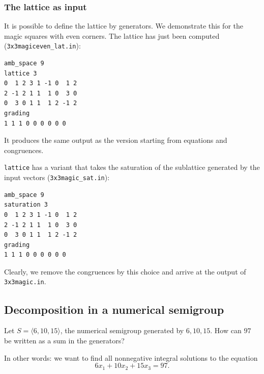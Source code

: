 \subsubsection{The lattice as input}\label{latt_ex}

It is possible to define the lattice by generators. We demonstrate this for the magic squares with even corners. The lattice has just been computed (\verb|3x3magiceven_lat.in|):

\begin{Verbatim}
amb_space 9
lattice 3
0  1 2 3 1 -1 0  1 2
2 -1 2 1 1  1 0  3 0
0  3 0 1 1  1 2 -1 2
grading
1 1 1 0 0 0 0 0 0
\end{Verbatim}
It produces the same output as the version starting from equations and congruences.

\verb|lattice| has a variant that takes the saturation of the sublattice generated by the input vectors (\verb|3x3magic_sat.in|):

\begin{Verbatim}
amb_space 9
saturation 3
0  1 2 3 1 -1 0  1 2
2 -1 2 1 1  1 0  3 0
0  3 0 1 1  1 2 -1 2
grading
1 1 1 0 0 0 0 0 0
\end{Verbatim}
Clearly, we remove the congruences by this choice and arrive at the output of \verb|3x3magic.in|.

\subsection{Decomposition in a numerical semigroup}\label{inhom_eq_ex}

Let $S=\langle 6,10,15\rangle$, the numerical semigroup generated by $6,10,15$. How can $97$ be written as a sum in the generators?\medskip

In other words: we want to find all nonnegative integral solutions to the equation
$$
6x_1+10x_2+15x_3=97.
$$

